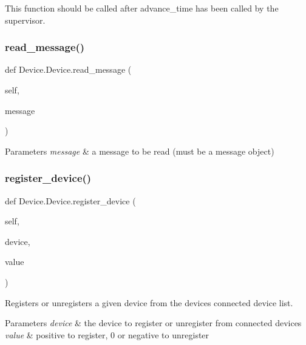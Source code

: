 This function should be called after advance\+\_\+time has been called by the supervisor. \mbox{\label{class_device_1_1_device_a1d4ccc0c3994e92d6c0cc22b0484801e}} 
\subsubsection{\texorpdfstring{read\+\_\+message()}{read\_message()}}
{\footnotesize\ttfamily def Device.\+Device.\+read\+\_\+message (\begin{DoxyParamCaption}\item[{}]{self,  }\item[{}]{message }\end{DoxyParamCaption})}


\begin{DoxyParams}{Parameters}
{\em message} & a message to be read (must be a message object) \\
\hline
\end{DoxyParams}
\mbox{\label{class_device_1_1_device_adc0a8678e0a0889ab254061e378be6fe}} 
\subsubsection{\texorpdfstring{register\+\_\+device()}{register\_device()}}
{\footnotesize\ttfamily def Device.\+Device.\+register\+\_\+device (\begin{DoxyParamCaption}\item[{}]{self,  }\item[{}]{device,  }\item[{}]{value }\end{DoxyParamCaption})}



Registers or unregisters a given device from the device\textquotesingle{}s connected device list. 


\begin{DoxyParams}{Parameters}
{\em device} & the device to register or unregister from connected devices \\
\hline
{\em value} & positive to register, 0 or negative to unregister \\
\hline
\end{DoxyParams}
\mbox{\label{class_device_1_1_device_abb9e113d3aba9118bbd205198e656b7a}} 

